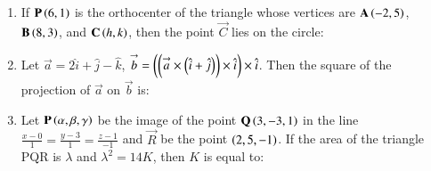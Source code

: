 \documentclass[journal,12pt,onecolumn]{IEEEtran}
\theoremstyle{remark}
\begin{document}
\begin{enumerate}
\begin{enumerate}
\end{enumerate}
\item If $\mathbf{P}\left(6, 1\right)$ is the orthocenter of the triangle whose vertices are $\mathbf{A}\left(-2, 5\right)$, $\mathbf{B}\left(8, 3\right)$, and $\mathbf{C} \left(h, k\right)$, then the point $\vec{C}$ lies on the circle:
\begin{enumerate}
\end{enumerate}
\item Let $\overset{\rightarrow}{a}= 2\hat{i}+\hat{j}-\hat{k}$, $\overset{\rightarrow}{b}=\left(\left(\overset{\rightarrow}{a}\times\left(\hat{i}+\hat{j}\right)\right)\times\hat{i}\right)\times\hat{i}$. Then the square of the projection of $\overset{\rightarrow}{a}$ on $\overset{\rightarrow}{b}$ is:  
\begin{enumerate}
\end{enumerate}
\item Let $\mathbf{P}\left(\alpha, \beta, \gamma\right)$ be the image of the point $\mathbf{Q}\left(3, -3, 1\right)$ in the line 
$\frac{x - 0}{1} = \frac{y - 3}{1} = \frac{z - 1}{-1}$ and $\vec{R}$ be the point $\left(2, 5, -1\right)$. If the area of the triangle PQR is $\lambda$ and $\lambda^2 = 14K$, then $K$ is equal to:
\begin{enumerate}
\end{enumerate}
\end{enumerate}
\end{document}
